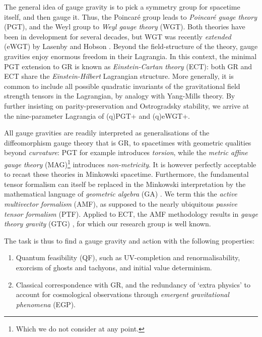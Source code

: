 \documentclass[twoside]{report}
\begin{document}
\begin{multicols}{2}
The general idea of gauge gravity is to pick a symmetry group for spacetime itself, and then gauge it. Thus, the Poincar\'e group leads to \textit{Poincar\'e guage theory} (PGT), and the Weyl group to \textit{Weyl gauge theory} (WGT). Both theories have been in development for several decades, but WGT was recently \textit{extended} (eWGT) by Lasenby and Hobson \cite{lasenby-hobson-2016}. Beyond the field-structure of the theory, gauge gravities enjoy enormous freedom in their Lagrangia. In this context, the minimal PGT extension to GR is known as \textit{Einstein-Cartan theory} (ECT): both GR and ECT share the \textit{Einstein-Hilbert} Lagrangian structure. More generally, it is common to include all possible quadratic invariants of the gravitational field strength tensors in the Lagrangian, by analogy with Yang-Mills theory. By further insisting on parity-preservation and Ostrogradsky stability, we arrive at the nine-parameter Lagrangia of (q)PGT+ and (q)eWGT+. 

All gauge gravities are readily interpreted as generalisations of the diffeomorphism gauge theory that is GR, to spacetimes with geometric qualities beyond \textit{curvature}: PGT for example introduces \textit{torsion}, while the \textit{metric affine gauge theory} (MAG)\footnote{Which we do not consider at any point.} introduces \textit{non-metricity}. It is however perfectly acceptable to recast these theories in Minkowski spacetime. Furthermore, the fundamental tensor formalism can itself be replaced in the Minkowski interpretation by the mathematical language of \textit{geometric algebra} (GA) \cite{doran-lasenby}. We term this the \textit{active multivector formalism} (AMF), as supposed to the nearly ubiquitous \textit{passive tensor formalism} (PTF). Applied to ECT, the AMF methodology results in \textit{gauge theory gravity} (GTG) \cite{1998RSPTA.356..487L}, for which our research group is well known. 

The task is thus to find a gauge gravity and action with the following properties:
\begin{enumerate}[resume]
  \item Quantum feasibility (QF), such as UV-completion and renormalisability, exorcism of ghosts and tachyons, and initial value determinism.
  \item Classical correspondence with GR, and the redundancy of `extra physics' to account for cosmological observations through \textit{emergent gravitational phenomena} (EGP).
\end{enumerate}


\end{multicols}
\end{document}
